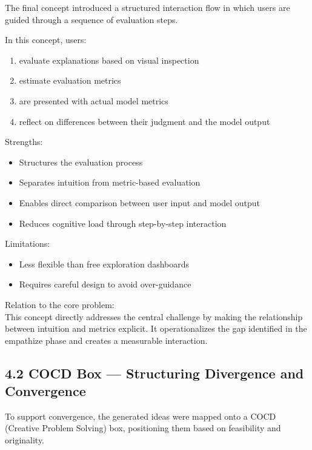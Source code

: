 \documentclass[
  letterpaper,
  DIV=11,
  numbers=noendperiod]{scrartcl}
\providecommand{\tightlist}{%
  \setlength{\itemsep}{0pt}\setlength{\parskip}{0pt}}\usepackage{longtable,booktabs,array}
\begin{document}
The final concept introduced a structured interaction flow in which
users are guided through a sequence of evaluation steps.

In this concept, users:

\begin{enumerate}
\def\labelenumi{\arabic{enumi}.}
\tightlist
\item
  evaluate explanations based on visual inspection
\item
  estimate evaluation metrics
\item
  are presented with actual model metrics
\item
  reflect on differences between their judgment and the model output
\end{enumerate}

Strengths:

\begin{itemize}
\tightlist
\item
  Structures the evaluation process
\item
  Separates intuition from metric-based evaluation
\item
  Enables direct comparison between user input and model output
\item
  Reduces cognitive load through step-by-step interaction
\end{itemize}

Limitations:

\begin{itemize}
\tightlist
\item
  Less flexible than free exploration dashboards
\item
  Requires careful design to avoid over-guidance
\end{itemize}

Relation to the core problem:\\
This concept directly addresses the central challenge by making the
relationship between intuition and metrics explicit. It operationalizes
the gap identified in the empathize phase and creates a measurable
interaction.

\subsection{4.2 COCD Box --- Structuring Divergence and
Convergence}\label{cocd-box-structuring-divergence-and-convergence}

To support convergence, the generated ideas were mapped onto a COCD
(Creative Problem Solving) box, positioning them based on feasibility
and originality.
\end{document}
